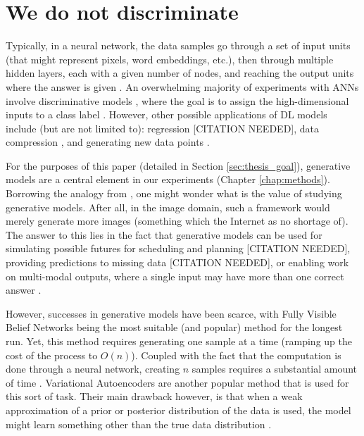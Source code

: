 \documentclass[a4paper]{book}
\begin{document}
\section{We do not discriminate}\label{sec:no_disc}

Typically, in a neural network, the data samples go through a set of input units (that might represent pixels, word embeddings, etc.), then through multiple hidden layers, each with a given number of nodes, and reaching the output units where the answer is given \parencite{marcus_deep_2018}. An overwhelming majority of experiments with ANNs involve discriminative models \parencite{goodfellow_generative_2014}, where the goal is to assign the high-dimensional inputs to a class label \parencite[such as an animal or piece of furniture;][]{zhang_character-level_2015, krizhevsky_imagenet_2012}. However, other possible applications of DL models include (but are not limited to): regression [CITATION NEEDED], data compression \parencite{cheng_deep_2018}, and generating new data points \parencite{graves_generating_2013}.

For the purposes of this paper (detailed in Section \ref{sec:thesis_goal}), generative models are a central element in our experiments (Chapter \ref{chap:methods}). Borrowing the analogy from \textcite{goodfellow_nips_2016}, one might wonder what is the value of studying generative models. After all, in the image domain, such a framework would merely generate more images (something which the Internet as no shortage of). The answer to this lies in the fact that generative models can be used for simulating possible futures for scheduling and planning [CITATION NEEDED], providing predictions to missing data [CITATION NEEDED], or enabling work on multi-modal outputs, where a single input may have more than one correct answer \parencite{goodfellow_nips_2016}.

However, successes in generative models have been scarce, with Fully Visible Belief Networks \parencite{frey_does_1996} being the most suitable (and popular) method for the longest run. Yet, this method requires generating one sample at a time (ramping up the cost of the process to $O(n)$). Coupled with the fact that the computation is done through a neural network, creating $n$ samples requires a substantial amount of time \parencite{goodfellow_nips_2016}. Variational Autoencoders \parencite{kingma_auto-encoding_2013} are another popular method that is used for this sort of task. Their main drawback however, is that when a weak approximation of a prior or posterior distribution of the data is used, the model might learn something other than the true data distribution \parencite{goodfellow_nips_2016}.
\end{document}
